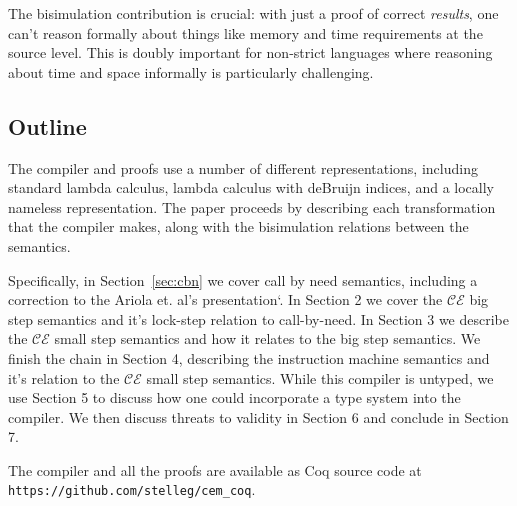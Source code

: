 The bisimulation contribution is crucial: with just a proof of correct
\emph{results}, one can't reason formally about things like memory and time
requirements at the source level. This is doubly important for non-strict
languages where reasoning about time and space informally is particularly
challenging.

\subsection{Outline}
The compiler and proofs use a number of different representations, including
standard lambda calculus, lambda calculus with deBruijn indices, and a locally
nameless representation. The paper proceeds by describing each transformation that
the compiler makes, along with the bisimulation relations between the semantics.

Specifically, in Section~\ref{sec:cbn} we cover call by need semantics, including a
correction to the Ariola et. al's presentation`\cite{ariola1995call}. In Section
2 we cover the $\mathcal{CE}$ big step semantics and it's lock-step relation to
call-by-need.  In Section 3 we describe the $\mathcal{CE}$ small step semantics
and how it relates to the big step semantics. We finish the chain in Section 4,
describing the instruction machine semantics and it's relation to the
$\mathcal{CE}$ small step semantics. While this compiler is untyped, we use
Section 5 to discuss how one could incorporate a type system into the compiler.
We then discuss threats to validity in Section 6 and conclude in Section 7. 

The compiler and all the proofs are available as Coq source code at
\texttt{https://github.com/stelleg/cem\_coq}.


